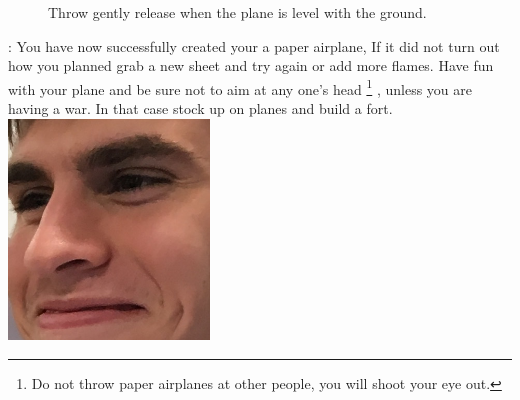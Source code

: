\documentclass[12pt]{article}
\newcommand\head[1]{\noindent{\large\textbf{#1}}:\newline}
\begin{document}
\begin{figure}[!t]
  \centering
  \caption{Throw gently release when the plane is level with the ground.}
  \qquad
\end{figure}

\vspace{\baselineskip}

\head{Conclusion}
\indent You have now successfully created your a paper airplane, If it did not turn out how you planned grab a new sheet and try again or add more flames.
 Have fun with your plane and be sure not to aim at any one's head
 \footnote[2]{Do not throw paper airplanes at other people, you will shoot your eye out.}
 , unless you are having a war. In that case stock up on planes and build a fort.
 \center\includegraphics[width=0.4\textwidth]{engl314/instructional/images/seventeenth.jpg}
\end{document}
